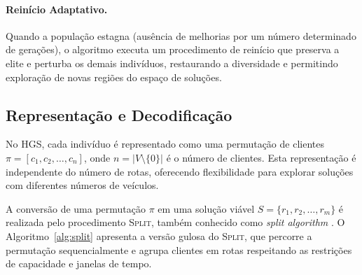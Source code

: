\paragraph{Reinício Adaptativo.} Quando a população estagna (ausência de melhorias por um número determinado de gerações), o algoritmo executa um procedimento de reinício que preserva a elite e perturba os demais indivíduos, restaurando a diversidade e permitindo exploração de novas regiões do espaço de soluções.

\subsection{Representação e Decodificação}

No HGS, cada indivíduo é representado como uma permutação de clientes $\pi = [c_1, c_2, \ldots, c_n]$, onde $n = |V \setminus \{0\}|$ é o número de clientes. Esta representação é independente do número de rotas, oferecendo flexibilidade para explorar soluções com diferentes números de veículos.

A conversão de uma permutação $\pi$ em uma solução viável $S = \{r_1, r_2, \ldots, r_m\}$ é realizada pelo procedimento \textsc{Split}, também conhecido como \emph{split algorithm} \cite{prins2004simple}. O Algoritmo~\ref{alg:split} apresenta a versão gulosa do \textsc{Split}, que percorre a permutação sequencialmente e agrupa clientes em rotas respeitando as restrições de capacidade e janelas de tempo.

